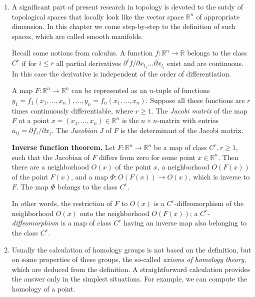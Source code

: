 \documentclass{ctexart}
\newcommand{\Rn}{\mathbb{R}^n}
\begin{document}
\begin{enumerate}
\item A significant part of present research in topology is devoted to
  the sutdy of topological spaces that locally look like the vector
  space $\Rn$ of appropriate dimension. In this chapter we
  come step-by-step to the definition of such spaces, which are called
  smooth manifolds.

Recall some notions from calculus. A function $f : \Rn \to
\mathbb{R}$ belongs to the class $C^r$ if for $i \leq r$ all partial
derivatives $\partial^if/\partial x_{l_1}\dots\partial x_{l_i}$ exist
and are continuous. In this case the derivative is independent of the
order of differentiation.

A map $F : \Rn \to \Rn$ can be represented as an
$n$-tuple of functions $y_1 = f_1(x_1,\dots,x_n),\dots,y_n =
f_n(x_1,\dots,x_n)$. Suppose all these functions are $r$ times
continuously differentiable, where $r \geq 1$. The \textit{Jacobi
  matrix} of the map $F$ at a point $x = (x_1,\dots,x_n) \in
\Rn$ is the $n \times n$-matrix with entries $a_{ij}
= \partial f_i/\partial x_j$. The \textit{Jacobian} $J$ of $F$ is the
determinant of the Jacobi matrix.

\textbf{Inverse function theorem.} Let $F : \Rn \to \Rn$ be a map of
class $C^r, r \geq 1$, such that the Jacobian of $F$ differs from zero
for some point $x \in \Rn$. Then there are a neighborhood $O(x)$ of
the point $x$, a neighborhood $O(F(x))$ of the point $F(x)$, and a map
$\Phi : O(F(x)) \to O(x)$, which is inverse to $F$. The map $\Phi$
belongs to the class $C^r$.

In other words, the restriction of $F$ to $O(x)$ is a
$C^r$-diffeomorphism of the neighborhood $O(x)$ onto the neighborhood
$O(F(x))$; a $C^r$-\textit{diffeomorphism} is a map of class $C^r$
having an inverse map also belonging to the class $C^r$.

\item Usually the calculation of homology groups is not based on the definition, but on some properties of these groups, the so-called \textit{axioms of homology theory}, which are deduced from the definition. A straightforward calculation provides the answer only in the simplest situations. For example, we can compute the homology of a point.

\end{enumerate}
\end{document}
